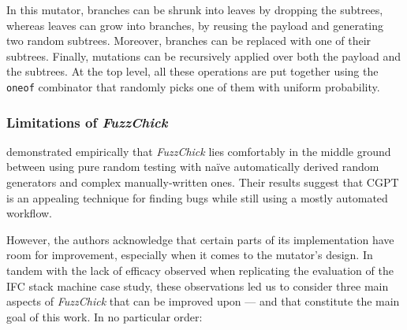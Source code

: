 \documentclass[acmsmall, anonymous]{acmart}
\newcommand{\fuzzchick}{\textit{FuzzChick}\xspace}
\begin{document}


In this mutator, branches can be shrunk into leaves by dropping the subtrees,
whereas leaves can grow into branches, by reusing the payload and generating two
random subtrees.
%
Moreover, branches can be replaced with one of their subtrees.
%
Finally, mutations can be recursively applied over both the payload and the
subtrees.
%
At the top level, all these operations are put together using the \texttt{oneof}
combinator that randomly picks one of them with uniform probability.

%
%
\subsubsection{Limitations of \fuzzchick}

\citeauthor{lampropoulos2019coverage} demonstrated empirically that \fuzzchick
lies comfortably in the middle ground between using pure random testing with
na\"ive automatically derived random generators and complex manually-written
ones.
%
Their results suggest that CGPT is an appealing technique for finding bugs while
still using a mostly automated workflow.


However, the authors acknowledge that certain parts of its implementation have
room for improvement, especially when it comes to the mutator's design.
%
In tandem with the lack of efficacy observed when replicating the evaluation of
the IFC stack machine case study, these observations led us to consider three
main aspects of \fuzzchick that can be improved upon --- and that constitute the
main goal of this work.
%
%
%
In no particular order:
\end{document}
